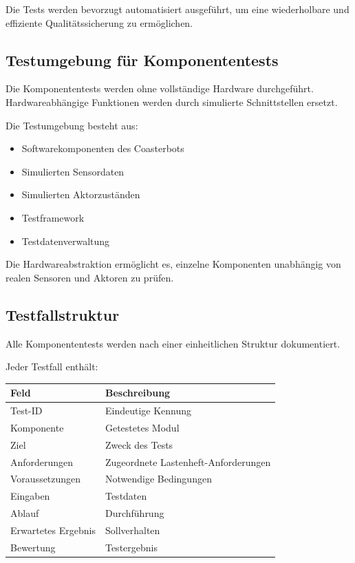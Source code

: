 Die Tests werden bevorzugt automatisiert ausgeführt, um eine
wiederholbare und effiziente Qualitätssicherung zu ermöglichen.

\subsection{Testumgebung für
Komponententests}\label{testumgebung-fuxfcr-komponententests}

Die Komponententests werden ohne vollständige Hardware durchgeführt.
Hardwareabhängige Funktionen werden durch simulierte Schnittstellen
ersetzt.

Die Testumgebung besteht aus:

\begin{itemize}
\tightlist
\item
  Softwarekomponenten des Coasterbots
\item
  Simulierten Sensordaten
\item
  Simulierten Aktorzuständen
\item
  Testframework
\item
  Testdatenverwaltung
\end{itemize}

Die Hardwareabstraktion ermöglicht es, einzelne Komponenten unabhängig
von realen Sensoren und Aktoren zu prüfen.

\subsection{Testfallstruktur}\label{testfallstruktur}

Alle Komponententests werden nach einer einheitlichen Struktur
dokumentiert.

Jeder Testfall enthält:

\begin{longtable}[]{@{}ll@{}}
\toprule\noalign{}
Feld & Beschreibung \\
\midrule\noalign{}
\endhead
\bottomrule\noalign{}
\endlastfoot
Test-ID & Eindeutige Kennung \\
Komponente & Getestetes Modul \\
Ziel & Zweck des Tests \\
Anforderungen & Zugeordnete Lastenheft-Anforderungen \\
Voraussetzungen & Notwendige Bedingungen \\
Eingaben & Testdaten \\
Ablauf & Durchführung \\
Erwartetes Ergebnis & Sollverhalten \\
Bewertung & Testergebnis \\
\end{longtable}

